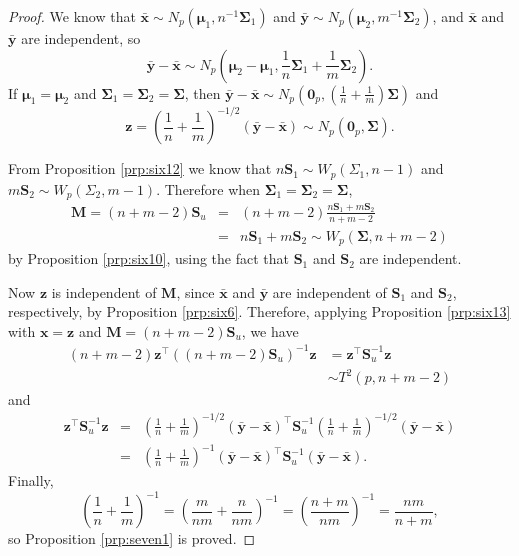 \documentclass[
]{book}
\theoremstyle{definition}
\theoremstyle{definition}
\theoremstyle{definition}
\theoremstyle{definition}
\theoremstyle{remark}
\begin{document}
\begin{proof}
We know that \(\bar{\mathbf x} \sim N_p \left({\boldsymbol{\mu}}_1,n^{-1}\boldsymbol{\Sigma}_1 \right)\) and \(\bar{\mathbf y} \sim N_p \left({\boldsymbol{\mu}}_2,m^{-1}\boldsymbol{\Sigma}_2 \right)\), and \(\bar{\mathbf x}\) and \(\bar{\mathbf y}\) are independent, so
\[\bar{\mathbf y} - \bar{\mathbf x} \sim N_p \left({\boldsymbol{\mu}}_2 - {\boldsymbol{\mu}}_1, \frac{1}{n}\boldsymbol{\Sigma}_1 + \frac{1}{m} \boldsymbol{\Sigma}_2 \right).\]
If \({\boldsymbol{\mu}}_1 = {\boldsymbol{\mu}}_2\) and \(\boldsymbol{\Sigma}_1 = \boldsymbol{\Sigma}_2 = \boldsymbol{\Sigma}\), then \(\bar{\mathbf y} - \bar{\mathbf x} \sim N_p \left(\boldsymbol 0_p, \left(\frac{1}{n} + \frac{1}{m} \right)\boldsymbol{\Sigma}\right)\) and
\[\mathbf z= \left(\frac{1}{n} + \frac{1}{m} \right)^{-1/2} (\bar{\mathbf y} - \bar{\mathbf x}) \sim N_p(\boldsymbol 0_p,\boldsymbol{\Sigma}).\]

From Proposition \ref{prp:six12} we know that \(n\mathbf S_1 \sim W_p(\Sigma_1,n-1)\) and \(m\mathbf S_2 \sim W_p(\Sigma_2,m-1)\). Therefore when \(\boldsymbol{\Sigma}_1 = \boldsymbol{\Sigma}_2 = \boldsymbol{\Sigma}\),
\begin{eqnarray*}
\mathbf M= (n+m-2)\mathbf S_u &=& (n+m-2)\frac{n\mathbf S_1 + m\mathbf S_2}{n+m-2} \\
&=& n\mathbf S_1 + m\mathbf S_2 \sim W_p(\boldsymbol{\Sigma},n+m-2)
\end{eqnarray*}
by Proposition \ref{prp:six10}, using the fact that \(\mathbf S_1\) and \(\mathbf S_2\) are independent.

Now \(\mathbf z\) is independent of \(\mathbf M\), since \(\bar{\mathbf x}\) and \(\bar{\mathbf y}\) are independent of \(\mathbf S_1\) and \(\mathbf S_2\), respectively, by Proposition \ref{prp:six6}. Therefore, applying Proposition \ref{prp:six13} with \(\mathbf x= \mathbf z\) and \(\mathbf M= (n+m-2)\mathbf S_u\), we have
\begin{align*}
(n+m-2) \mathbf z^\top ((n+m-2)\mathbf S_u)^{-1} \mathbf z&= \mathbf z^\top \mathbf S_u^{-1} \mathbf z\\
&\sim T^2(p,n+m-2)
\end{align*}
and
\begin{eqnarray*}
\mathbf z^\top \mathbf S_u^{-1} \mathbf z&=& \left(\frac{1}{n} + \frac{1}{m} \right)^{-1/2} (\bar{\mathbf y} - \bar{\mathbf x})^\top \mathbf S_u^{-1} \left(\frac{1}{n} + \frac{1}{m} \right)^{-1/2} (\bar{\mathbf y} - \bar{\mathbf x}) \\
&=& \left(\frac{1}{n} + \frac{1}{m} \right)^{-1} (\bar{\mathbf y} - \bar{\mathbf x})^\top \mathbf S_u^{-1} (\bar{\mathbf y} - \bar{\mathbf x}).
\end{eqnarray*}
Finally,
\[\left(\frac{1}{n} + \frac{1}{m} \right)^{-1} = \left(\frac{m}{nm} + \frac{n}{nm} \right)^{-1} = \left(\frac{n+m}{nm} \right)^{-1} = \frac{nm}{n+m},\]
so Proposition \ref{prp:seven1} is proved.
\end{proof}
\end{document}
